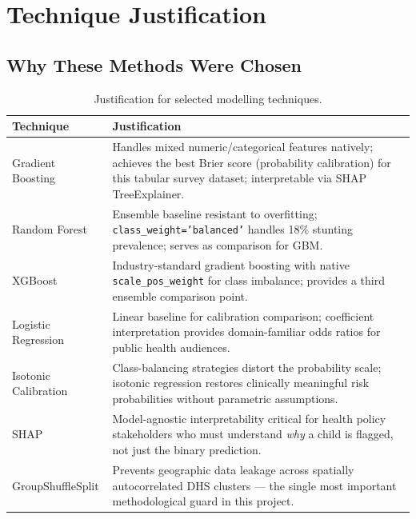 \documentclass[12pt, a4paper]{article}
\begin{document}
\section{Technique Justification}

\subsection{Why These Methods Were Chosen}

\begin{table}[H]
\centering
\caption{Justification for selected modelling techniques.}
\label{tab:justification}
\begin{tabular}{p{3.8cm}p{9.5cm}}
\toprule
\textbf{Technique} & \textbf{Justification} \\
\midrule
Gradient Boosting & Handles mixed numeric/categorical features natively; achieves the best Brier score (probability calibration) for this tabular survey dataset; interpretable via SHAP TreeExplainer. \\
\addlinespace
Random Forest & Ensemble baseline resistant to overfitting; \texttt{class\_weight='balanced'} handles 18\% stunting prevalence; serves as comparison for GBM. \\
\addlinespace
XGBoost & Industry-standard gradient boosting with native \texttt{scale\_pos\_weight} for class imbalance; provides a third ensemble comparison point. \\
\addlinespace
Logistic Regression & Linear baseline for calibration comparison; coefficient interpretation provides domain-familiar odds ratios for public health audiences. \\
\addlinespace
Isotonic Calibration & Class-balancing strategies distort the probability scale; isotonic regression restores clinically meaningful risk probabilities without parametric assumptions. \\
\addlinespace
SHAP & Model-agnostic interpretability critical for health policy stakeholders who must understand \emph{why} a child is flagged, not just the binary prediction. \\
\addlinespace
GroupShuffleSplit & Prevents geographic data leakage across spatially autocorrelated DHS clusters — the single most important methodological guard in this project. \\
\bottomrule
\end{tabular}
\end{table}
\end{document}
